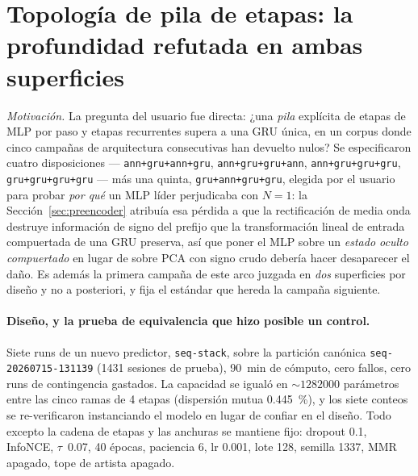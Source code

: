 \documentclass[11pt]{article}
\newcommand{\dsid}[1]{\texttt{\small #1}}
\begin{document}
\section{Topología de pila de etapas: la profundidad refutada en ambas superficies}
\label{sec:stagestack}
\emph{Motivación.} La pregunta del usuario fue directa: ¿una \emph{pila} explícita
de etapas de MLP por paso y etapas recurrentes supera a una GRU única, en un corpus
donde cinco campañas de arquitectura consecutivas han devuelto nulos? Se
especificaron cuatro disposiciones --- \texttt{ann+gru+ann+gru},
\texttt{ann+gru+gru+ann}, \texttt{ann+gru+gru+gru}, \texttt{gru+gru+gru+gru} ---
más una quinta, \texttt{gru+ann+gru+gru}, elegida por el usuario para probar
\emph{por qué} un MLP líder perjudicaba con $N=1$: la
Sección~\ref{sec:preencoder} atribuía esa pérdida a que la rectificación de media
onda destruye información de signo del prefijo que la transformación lineal de
entrada compuertada de una GRU preserva, así que poner el MLP sobre un \emph{estado
oculto compuertado} en lugar de sobre PCA con signo crudo debería hacer desaparecer
el daño. Es además la primera campaña de este arco juzgada en \emph{dos}
superficies por diseño y no a posteriori, y fija el estándar que hereda la campaña
siguiente.

\paragraph{Diseño, y la prueba de equivalencia que hizo posible un control.} Siete
runs de un nuevo predictor, \texttt{seq-stack}, sobre la partición canónica
\dsid{seq-20260715-131139} (\num{1431} sesiones de prueba), \SI{90}{\minute} de
cómputo, cero fallos, cero runs de contingencia gastados. La capacidad se igualó en
${\sim}\num{1282000}$ parámetros entre las cinco ramas de 4 etapas (dispersión
mutua \SI{0.445}{\percent}), y los siete conteos se re-verificaron instanciando el
modelo en lugar de confiar en el diseño. Todo excepto la cadena de etapas y las
anchuras se mantiene fijo: dropout \num{0.1}, InfoNCE, $\tau$~\num{0.07},
\num{40} épocas, paciencia \num{6}, lr \num{0.001}, lote \num{128}, semilla
\num{1337}, MMR apagado, tope de artista apagado.
\end{document}
